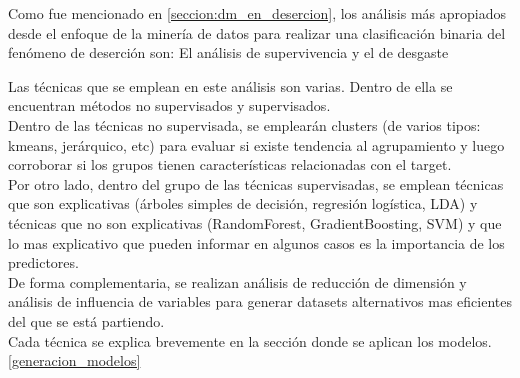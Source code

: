 

Como fue mencionado en \ref{seccion:dm_en_desercion}, los análisis más apropiados desde el enfoque de la minería de datos para realizar una clasificación binaria del fenómeno de deserción son: El análisis de supervivencia y el de desgaste \cite{PredictModel-GarciaVellidoNebot}


Las técnicas que se emplean en este análisis son varias. Dentro de ella se encuentran métodos no supervisados y supervisados.\\
Dentro de las técnicas no supervisada, se emplearán clusters (de varios tipos: kmeans, jerárquico, etc) para evaluar si existe tendencia al agrupamiento y luego corroborar si los grupos tienen características relacionadas con el target. \\
Por otro lado, dentro del grupo de las técnicas supervisadas, se emplean técnicas que son explicativas (árboles simples de decisión, regresión logística, LDA) y técnicas que no son explicativas (RandomForest, GradientBoosting, SVM) y que lo mas explicativo que pueden informar en algunos casos es la importancia de los predictores.\\

De forma complementaria, se realizan análisis de reducción de dimensión y análisis de influencia de variables para generar datasets alternativos mas eficientes del que se está partiendo.\\

Cada técnica se explica brevemente en la sección donde se aplican los modelos.\ref{generacion_modelos}

